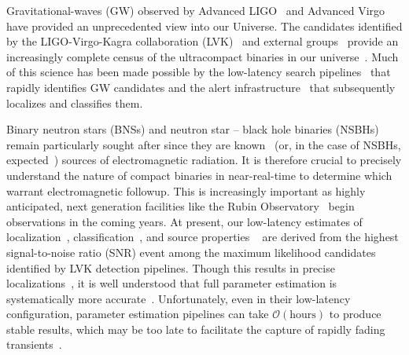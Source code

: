 \documentclass[twocolumn,prd,superscriptaddress,nofootinbib]{revtex4-1}
\begin{document}
Gravitational-waves (GW) observed by Advanced
LIGO~\cite{LIGOScientific:2014pky} and Advanced Virgo~\cite{VIRGO:2014yos} have
provided an unprecedented view into our Universe. The candidates identified by
the LIGO-Virgo-Kagra collaboration (LVK)~\cite{LIGOScientific:2021djp} and external
groups~\cite{Nitz:2018imz,Magee:2019vmb,Venumadhav:2019lyq,Zackay:2019btq,Nitz:2020oeq,Nitz:2021uxj,Nitz:2021zwj,Olsen:2022pin}
provide an increasingly complete census of the ultracompact binaries in our
universe~\cite{KAGRA:2021duu}. Much of this science has been made possible by
the low-latency search
pipelines~\cite{Tsukada:2023edh,Nitz:2018rgo,Aubin:2020goo,Chu:2020pjv,Drago:2020kic}
that rapidly identifies GW candidates and the alert infrastructure~\cite{Magee:2021xdx,Chaudhary:2023vec}
that subsequently localizes and classifies them.

Binary neutron stars (BNSs) and neutron
star -- black hole binaries (NSBHs) remain particularly sought after since they
are known~\cite{LIGOScientific:2017vwq,LIGOScientific:2017ync} (or, in the case
of NSBHs, expected~\cite{PhysRevD.98.081501}) sources of electromagnetic
radiation.  It is therefore crucial to precisely understand the nature of compact
binaries in near-real-time to determine which warrant electromagnetic followup.
This is increasingly important as highly anticipated, next generation
facilities like the Rubin
Observatory~\cite{Ivezic:2008fe} begin observations in the coming years. At
present, our low-latency estimates of localization~\cite{Singer:2015ema},
classification~\cite{2015PhRvD..91b3005F,Kapadia:2019uut,Andres:2021vew,Villa-Ortega:2022qdo},
and source properties
~\cite{PhysRevD.98.081501,PhysRevD.104.083003} are derived from the highest
signal-to-noise ratio (SNR) event among the maximum likelihood candidates identified by LVK
detection pipelines. Though this results in precise
localizations~\cite{Singer:2014qca}, it is well understood that full parameter
estimation is systematically more accurate~\cite{Chaudhary:2023vec}.
Unfortunately, even in their low-latency configuration, parameter estimation pipelines can take
$\mathcal{O}(\mathrm{hours})$ to produce stable results, which may be too late
to facilitate the capture of rapidly fading transients~\cite{Cowperthwaite:2017dyu}. 
\end{document}
